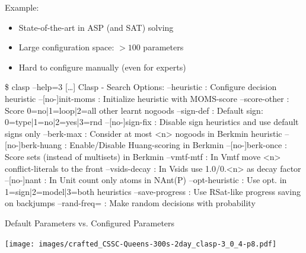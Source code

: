 \begin{frame}[c,fragile]{Example: \clasp{}}

\begin{itemize}
  \item State-of-the-art in ASP (and SAT) solving%
  \medskip
  \pause
  \item Large configuration space: $> 100$ parameters
  \item Hard to configure manually (even for experts)
\end{itemize}

\scriptsize
\begin{semiverbatim}
\$ clasp --help=3
[\ldots]
Clasp - Search Options:
  --heuristic             : Configure decision heuristic
  --[no-]init-moms        : Initialize heuristic with MOMS-score
  --score-other           : Score {0=no|1=loop|2=all} other learnt nogoods
  --sign-def              : Default sign: {0=type|1=no|2=yes|3=rnd}
  --[no-]sign-fix         : Disable sign heuristics and use default signs only
  --berk-max              : Consider at most <n> nogoods in Berkmin heuristic
  --[no-]berk-huang       : Enable/Disable Huang-scoring in Berkmin
  --[no-]berk-once        : Score sets (instead of multisets) in Berkmin
  --vmtf-mtf              : In Vmtf move <n> conflict-literals to the front
  --vsids-decay           : In Vsids use 1.0/0.<n> as decay factor
  --[no-]nant             : In Unit count only atoms in NAnt(P)
  --opt-heuristic         : Use opt. in {1=sign|2=model|3=both} heuristics
  --save-progress         : Use RSat-like progress saving on backjumps 
  --rand-freq=            : Make random decisions with probability 
\end{semiverbatim}

\end{frame}
\begin{frame}[c]{Default Parameters vs. Configured Parameters}

\centering
\texttt{[image: images/crafted\_CSSC-Queens-300s-2day\_clasp-3\_0\_4-p8.pdf]}

\end{frame}

